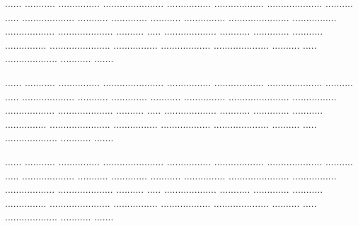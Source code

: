 \begin{spacing}{1.25}
	\begin{justify}
		\begin{footnotesize}

%			
%	

\noindent
...... ........... ............... ...................... ................ .................. .................... .......... ..... ................... ........... ............. ........... ............... ...................... ................ .................. .................... .......... ..... ................... ........... ............. ........... ............... ...................... ................ .................. .................... .......... ..... ................... ........... .......\vspace*{3mm}

\noindent
...... ........... ............... ...................... ................ .................. .................... .......... ..... ................... ........... ............. ........... ............... ...................... ................ .................. .................... .......... ..... ................... ........... ............. ........... ............... ...................... ................ .................. .................... .......... ..... ................... ........... .......\vspace*{3mm}

\noindent
...... ........... ............... ...................... ................ .................. .................... .......... ..... ................... ........... ............. ........... ............... ...................... ................ .................. .................... .......... ..... ................... ........... ............. ........... ............... ...................... ................ .................. .................... .......... ..... ................... ........... .......\vspace*{3mm}


\end{footnotesize}
\end{justify}
\end{spacing}
